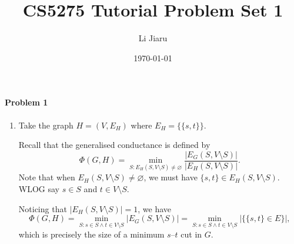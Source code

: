 \documentclass[12pt]{article}
\title{CS5275 Tutorial Problem Set 1}
\author{Li Jiaru}
\date{\today}
\begin{document}
\maketitle
\paragraph{Problem 1}
\begin{enumerate}
\item
Take the graph $H=(V, E_H)$ where $E_H=\{\{s,t\}\}$.

Recall that the generalised conductance is defined by
$$\Phi(G,H)=\min_{S:E_H(S,V\setminus S)\ne\varnothing}\frac{|E_G(S,V\setminus S)|}{|E_H(S,V\setminus S)|}.$$
Note that when $E_H(S,V\setminus S)\ne\varnothing$, we must have $\{s,t\}\in E_H(S,V\setminus S)$. WLOG say $s\in S$ and $t\in V\setminus S$.

Noticing that $|E_H(S,V\setminus S)|=1$, we have
$$\Phi(G,H)=\min_{S:s\in S\land t\in V\setminus S}|E_G(S,V\setminus S)|=\min_{S:s\in S\land t\in V\setminus S}|\{\{s,t\}\in E\}|,$$
which is precisely the size of a minimum $s$–$t$ cut in $G$.
\end{enumerate}
\end{document}
